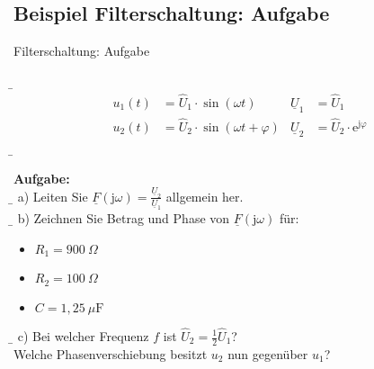 
\subsection{Beispiel Filterschaltung: Aufgabe}
\begin{frame}\ftx{\subsecname}
\begin{bsp}{Filterschaltung: Aufgabe}{}%
\noindent%
\begin{minipage}{\textwidth}
    \begin{minipage}[c]{0.44\textwidth}
        \b{\vfill}%
        \begin{align*}
        u_1(t) &= \hat{U}_1\cdot \sin(\omega t)             & \underline{U}_1 &= \hat{U}_1\\
        u_2(t) &= \hat{U}_2\cdot \sin(\omega t + \varphi)   & \underline{U}_2 &= \hat{U}_2 \cdot \mathrm{e}^{\mathrm{j}\varphi}
        \end{align*}
        \b{\vfill}
    \end{minipage}\hfill
    \begin{minipage}[c]{0.52\textwidth}
        \textbf{Aufgabe:}\\\b{\vfill}
        a) Leiten Sie $\underline{F}(\mathrm{j}\omega) = \frac{\underline{U}_2}{\underline{U}_1}$ allgemein her.\\
        \b{\vfill}
        b) Zeichnen Sie Betrag und Phase von $\underline{F}(\mathrm{j}\omega)$ für:
        \begin{itemize}
            \item[] $R_1 = 900\ \Omega$
            \item[] $R_2 = 100\ \Omega$
            \item[] $C = 1,25\ \mu \mathrm{F}$
        \end{itemize}
        \b{\vfill}
        c) Bei welcher Frequenz $f$ ist $\hat{U}_2 = \frac{1}{2}\hat{U}_1$? \\
        Welche Phasenverschiebung besitzt $u_2$ nun gegenüber $u_1$?
    \end{minipage}	
\end{minipage}
\end{bsp}%
\end{frame}%
